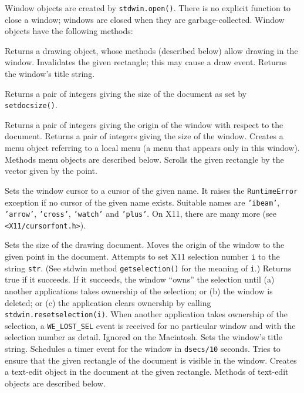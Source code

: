 Window objects are created by
{\tt stdwin.open()}.
There is no explicit function to close a window; windows are closed when
they are garbage-collected.
Window objects have the following methods:
\begin{description}
Returns a drawing object, whose methods (described below) allow drawing
in the window.
Invalidates the given rectangle; this may cause a draw event.
Returns the window's title string.
\begin{sloppypar}
Returns a pair of integers giving the size of the document as set by
{\tt setdocsize()}.
\end{sloppypar}
Returns a pair of integers giving the origin of the window with respect
to the document.
Returns a pair of integers giving the size of the window.
Creates a menu object referring to a local menu (a menu that appears
only in this window).
Methods menu objects are described below.
Scrolls the given rectangle by the vector given by the point.
\begin{sloppypar}
Sets the window cursor to a cursor of the given name.
It raises the
{\tt Runtime\-Error}
exception if no cursor of the given name exists.
Suitable names are
{\tt 'ibeam'},
{\tt 'arrow'},
{\tt 'cross'},
{\tt 'watch'}
and
{\tt 'plus'}.
On X11, there are many more (see
{\tt <X11/cursorfont.h>}).
\end{sloppypar}
Sets the size of the drawing document.
Moves the origin of the window to the given point in the document.
Attempts to set X11 selection number
{\tt i}
to the string
{\tt str}.
(See stdwin method
{\tt getselection()}
for the meaning of
{\tt i}.)
Returns true if it succeeds.
If it succeeds, the window ``owns'' the selection until
(a) another applications takes ownership of the selection; or
(b) the window is deleted; or
(c) the application clears ownership by calling
{\tt stdwin.resetselection(i)}.
When another application takes ownership of the selection, a
{\tt WE\_LOST\_SEL}
event is received for no particular window and with the selection number
as detail.
Ignored on the Macintosh.
Sets the window's title string.
Schedules a timer event for the window in
{\tt dsecs/10}
seconds.
Tries to ensure that the given rectangle of the document is visible in
the window.
Creates a text-edit object in the document at the given rectangle.
Methods of text-edit objects are described below.
\end{description}

